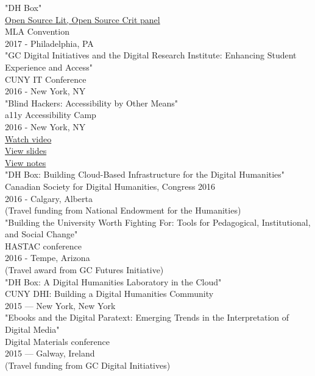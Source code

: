 \documentclass[11pt]{article}
\begin{document}
"DH Box"\\
\href{https://text.mla.hcommons.org/}{Open Source Lit, Open Source Crit panel}\\
MLA Convention\\
2017 - Philadelphia, PA\\

"GC Digital Initiatives and the Digital Research Institute: Enhancing Student Experience and Access"\\
CUNY IT Conference\\
2016 - New York, NY\\

"Blind Hackers: Accessibility by Other Means"\\
a11y Accessibility Camp\\
2016 - New York, NY\\
\href{https://www.youtube.com/watch?v=W8_O3joo4aU}{Watch video}\\
\href{http://htmlpreview.github.io/?https://github.com/smythp/blind-hackers/blob/master/presentation/foo.html}{View slides}\\
\href{https://github.com/smythp/blind-hackers}{View notes}\\

"DH Box: Building Cloud-Based Infrastructure for the Digital Humanities"\\
Canadian Society for Digital Humanities, Congress 2016\\
2016 - Calgary, Alberta\\
(Travel funding from National Endowment for the Humanities)\\

"Building the University Worth Fighting For: Tools for Pedagogical, Institutional, and Social Change"\\
HASTAC conference\\
2016 - Tempe, Arizona\\
(Travel award from GC Futures Initiative)\\

"DH Box: A Digital Humanities Laboratory in the Cloud"\\
CUNY DHI: Building a Digital Humanities Community\\
2015 — New York, New York\\

"Ebooks and the Digital Paratext: Emerging Trends in the Interpretation of Digital Media"\\
Digital Materials conference\\
2015 — Galway, Ireland\\
(Travel funding from GC Digital Initiatives)\\
\end{document}
